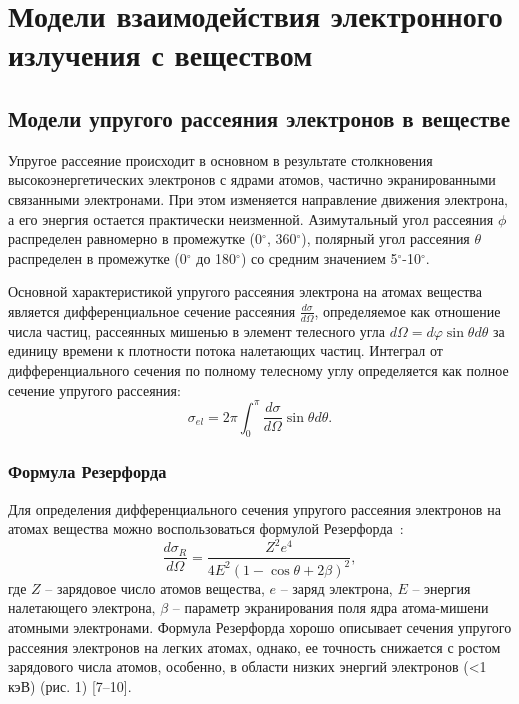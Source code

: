 \section{Модели взаимодействия электронного излучения с веществом}

\subsection{Модели упругого рассеяния электронов в веществе}
Упругое рассеяние происходит в основном в результате столкновения высокоэнергетических электронов с ядрами атомов, частично экранированными связанными электронами. При этом изменяется направление движения электрона, а его энергия остается практически неизменной. Азимутальный угол рассеяния $\phi$ распределен равномерно в промежутке (0$^\circ$, 360$^\circ$), полярный угол рассеяния $\theta$ распределен в промежутке (0$^\circ$ до 180$^\circ$) со средним значением 5$^\circ$-10$^\circ$.

Основной характеристикой упругого рассеяния электрона на атомах вещества является дифференциальное сечение рассеяния $\frac{d \sigma}{d \Omega}$, определяемое как отношение числа частиц, рассеянных мишенью в элемент телесного угла $d \Omega = d \varphi \sin \theta d \theta$ за единицу времени к плотности потока налетающих частиц. Интеграл от дифференциального сечения по полному телесному углу определяется как полное сечение упругого рассеяния:
\begin{equation} \label{eq:models_1}
	\sigma_{el}=2 \pi \int_0^\pi \frac{d \sigma}{d \Omega} \sin \theta d \theta.
\end{equation}

\subsubsection{Формула Резерфорда}
Для определения дифференциального сечения упругого рассеяния электронов на атомах вещества можно воспользоваться формулой Резерфорда~\cite{Dapor_large_book}:
\begin{equation} \label{eq:models_3}
	\frac{d \sigma_R}{d \Omega}=\frac{Z^2 e^4}{4 E^2(1-\cos \theta+2 \beta)^2},
\end{equation}
где $Z$ -- зарядовое число атомов вещества, $e$ -- заряд электрона, $E$ -- энергия налетающего электрона, $\beta$ -- параметр экранирования поля ядра атома-мишени атомными электронами. Формула Резерфорда хорошо описывает сечения упругого рассеяния электронов на легких атомах, однако, ее точность снижается с ростом зарядового числа атомов, особенно, в области низких энергий электронов (<1 кэВ) (рис. 1) [7–10].

